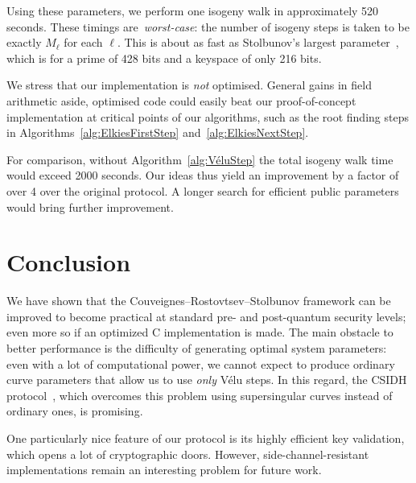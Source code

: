 \documentclass{llncs}
\begin{document}
Using these parameters, we perform one isogeny walk in
approximately 520 seconds.
These timings are~\emph{worst-case}:
the number of isogeny steps is taken
to be exactly $M_\ell$ for each $\ell$.
This is about as fast as Stolbunov's largest parameter~\cite{Stol},
which is for a prime of 428 bits and a keyspace of only 216 bits.

We stress that our implementation
is \emph{not} optimised. General gains in field arithmetic aside,
optimised code could easily beat our proof-of-concept implementation
at critical points of our algorithms, such as the root finding steps 
in Algorithms~\ref{alg:ElkiesFirstStep}
and~\ref{alg:ElkiesNextStep}.

For comparison, without Algorithm~\ref{alg:VéluStep} the
total isogeny walk time would exceed 2000 seconds.
Our ideas thus yield an improvement by a factor of over 4 over the
original protocol. A longer search for efficient public
parameters would bring further improvement.

\section{Conclusion}

We have shown that the Couveignes--Rostovtsev--Stolbunov
framework can be improved to become practical at standard pre- and
post-quantum security levels; 
even more so if an optimized C implementation is made. 
The main obstacle to better performance 
is the difficulty of generating optimal system parameters:
even with a lot of computational power,
we cannot expect to produce ordinary curve parameters
that allow us to use \emph{only} Vélu steps. 
In this regard, the CSIDH protocol~\cite{csidh}, 
which overcomes this problem using
supersingular curves instead of ordinary ones, is promising.

One particularly nice feature of our protocol is its highly efficient key validation,
which opens a lot of cryptographic doors. However, side-channel-resistant
implementations remain an interesting problem for future work.




\end{document}
